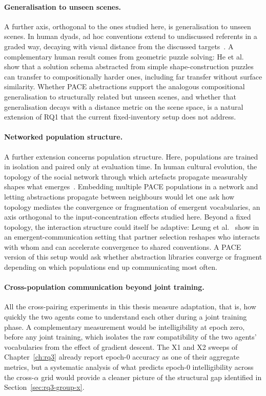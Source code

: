 \paragraph{Generalisation to unseen scenes.}
A further axis, orthogonal to the ones studied here, is generalisation to unseen scenes. In human dyads, ad hoc conventions extend to undiscussed referents in a graded way, decaying with visual distance from the discussed targets~\cite{ji_ad_2025}. A complementary human result comes from geometric puzzle solving: He et al.~\cite{he_bootstrapping_2025} show that a solution schema abstracted from simple shape-construction puzzles can transfer to compositionally harder ones, including far transfer without surface similarity. Whether PACE abstractions support the analogous compositional generalisation to structurally related but unseen scenes, and whether that generalisation decays with a distance metric on the scene space, is a natural extension of RQ1 that the current fixed-inventory setup does not address.

\paragraph{Networked population structure.}
A further extension concerns population structure. Here, populations are trained in isolation and paired only at evaluation time. In human cultural evolution, the topology of the social network through which artefacts propagate measurably shapes what emerges~\cite{marjieh_characterizing_2025}. Embedding multiple PACE populations in a network and letting abstractions propagate between neighbours would let one ask how topology mediates the convergence or fragmentation of emergent vocabularies, an axis orthogonal to the input-concentration effects studied here. Beyond a fixed topology, the interaction structure could itself be adaptive: Leung et al.~\cite{leung_curiosity-driven_2025} show in an emergent-communication setting that partner selection reshapes who interacts with whom and can accelerate convergence to shared conventions. A PACE version of this setup would ask whether abstraction libraries converge or fragment depending on which populations end up communicating most often.

\paragraph{Cross-population communication beyond joint training.}
All the cross-pairing experiments in this thesis measure adaptation, that is, how quickly the two agents come to understand each other during a joint training phase. A complementary measurement would be intelligibility at epoch zero, before any joint training, which isolates the raw compatibility of the two agents' vocabularies from the effect of gradient descent. The X1 and X2 sweeps of Chapter~\ref{ch:rq3} already report epoch-0 accuracy as one of their aggregate metrics, but a systematic analysis of what predicts epoch-0 intelligibility across the cross-$\alpha$ grid would provide a cleaner picture of the structural gap identified in Section~\ref{sec:rq3-group-x}.

